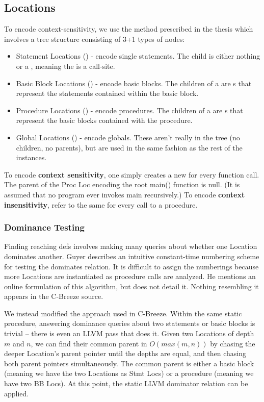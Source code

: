 \subsection{Locations}

To encode context-sensitivity, we use the method prescribed in the thesis which
involves a tree structure consisting of 3+1 types of nodes:

\begin{itemize}
\item Statement Locations () - encode single statements. The
      child is either nothing or a , meaning the  is a
      call-site.
\item Basic Block Locations () - encode basic blocks. The children
      of a  are s that represent the statements
      contained within the basic block.
\item Procedure Locations () - encode procedures. The children
      of a  are s that represent the basic blocks
      contained with the procedure.
\item Global Locations () - encode globals. These aren't really in
      the tree (no children, no parents), but are used in the same fashion as the 
      rest of the  instances.
\end{itemize}

To encode {\bf context sensitivity}, one simply creates a new 
for every function call. The parent of the Proc Loc encoding the root main()
function is null. (It is assumed that no program ever invokes main recursively.)
To encode {\bf context insensitivity}, refer to the same  for
every call to a procedure.

\subsubsection{Dominance Testing}

Finding reaching defs involves making many queries about whether one Location
dominates another. Guyer describes an intuitive constant-time numbering scheme
for testing the dominates relation. It is difficult to assign the numberings
because more Locations are instantiated as procedure calls are analyzed. He
mentions an online formulation of this algorithm, but does not detail it.
Nothing resembling it appears in the C-Breeze source.

We instead modified the approach used in C-Breeze. Within the same static procedure,
answering dominance queries about two statements or basic blocks is trivial --
there is even an LLVM pass that does it. Given two Locations of depth $m$ and
$n$, we can find their common parent in $O(max(m, n))$ by chasing the deeper
Location's parent pointer until the depths are equal, and then chasing both
parent pointers simultaneously. The common parent is either a basic block
(meaning we have the two Locations as Stmt Locs) or a procedure (meaning we have
two BB Locs). At this point, the static LLVM dominator relation can be applied.

